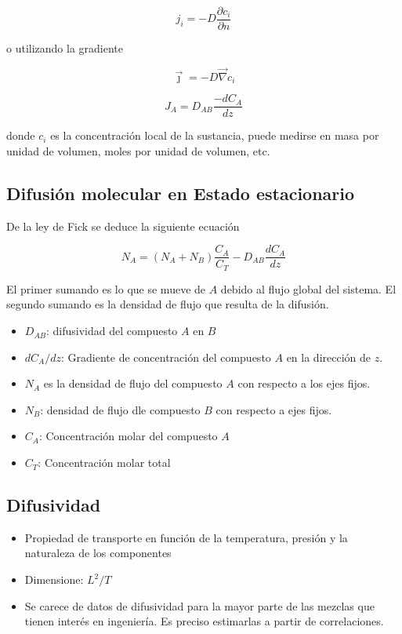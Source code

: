 \begin{equation}
    j_i = -D \frac{\partial c_i}{\partial n}
\end{equation}

o utilizando la gradiente

\begin{equation}
    \vec \jmath = -D \vec \nabla c_i
\end{equation}


\begin{equation}
    J_A = D_{AB} \frac{-dC_A}{dz}
\end{equation}

donde $c_i$ es la concentración local de la sustancia, puede
medirse en masa por unidad de volumen, moles por unidad de volumen, etc.

\subsection{Difusión molecular en Estado estacionario}

De la ley de Fick se deduce la siguiente ecuación

\begin{equation}
    N_A = (N_A + N_B) \frac{C_A}{C_T} - D_{AB} \frac{dC_A}{dz}
\end{equation}

El primer sumando es lo que se mueve de $A$ debido al flujo global
del sistema.
El segundo sumando es la densidad de flujo que resulta
de la difusión.


\begin{itemize}
    \item $D_{AB}$: difusividad del compuesto $A$ en $B$
    \item $dC_A/dz$: Gradiente de concentración del compuesto $A$ en
    la dirección de $z$.
    \item $N_A$ es la densidad de flujo del compuesto $A$ con respecto a los ejes fijos.
    \item $N_B$: densidad de flujo dle compuesto $B$ con respecto a ejes fijos.
    \item $C_A$: Concentración molar del compuesto $A$
    \item $C_T$: Concentración molar total
\end{itemize}

\subsection{Difusividad}
\begin{itemize}
    \item Propiedad de transporte en función de la temperatura, presión
    y la naturaleza de los componentes
    \item Dimensione: $L^2/T$
    \item Se carece de datos de difusividad para 
    la mayor parte de las mezclas que tienen interés en ingeniería.
    Es preciso estimarlas a partir de correlaciones.
\end{itemize}